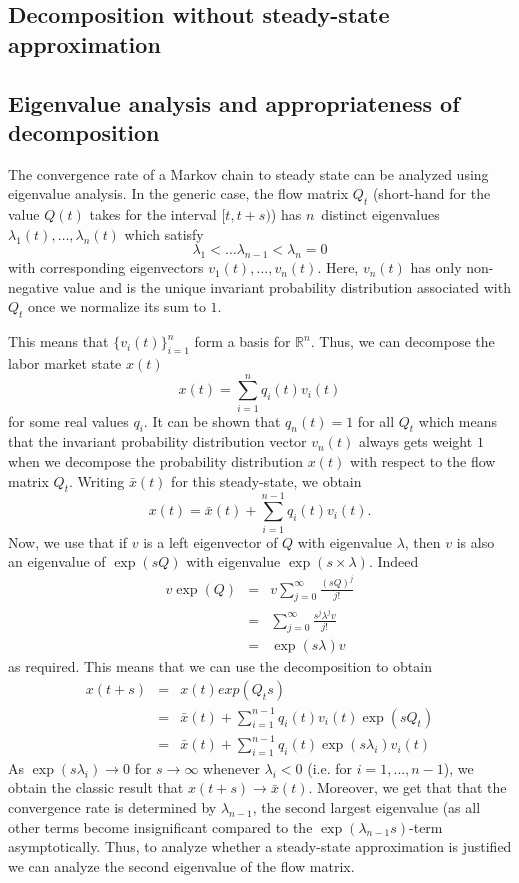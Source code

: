 \subsection{Decomposition without steady-state approximation}
\subsection{Eigenvalue analysis and appropriateness of decomposition}
The convergence rate of a Markov chain to steady state can be analyzed using eigenvalue analysis. In the generic case, the flow matrix $Q_t$ (short-hand for the value $Q(t)$ takes for the interval $[t,t+s)$) has $n$ distinct eigenvalues $\lambda_1(t),\dots,\lambda_n(t)$ which satisfy
\[
\lambda_1 < \dots \lambda_{n-1}<\lambda_n = 0
\]
with corresponding eigenvectors $v_1(t),\dots,v_n(t)$. Here, $v_n(t)$ has only non-negative value and is the unique invariant probability distribution associated with $Q_t$ once we normalize its sum to $1$.

This means that $\{v_i(t)\}_{i=1}^n$ form a basis for $\mathbb{R}^n$. Thus, we can decompose the labor market state $x(t)$
\[
x(t)=\sum_{i=1}^n q_i(t)v_i(t)
\]
for some real values $q_i$. It can be shown that $q_n(t)=1$ for all $Q_t$ which means that the invariant probability distribution vector $v_n(t)$ always gets weight $1$ when we decompose the probability distribution $x(t)$ with respect to the flow matrix $Q_t$. Writing $\bar{x}(t)$ for this steady-state, we obtain
\[
x(t)=\bar{x}(t)+\sum_{i=1}^{n-1}q_i(t)v_i(t).
\]
Now, we use that if $v$ is a left eigenvector of $Q$ with eigenvalue $\lambda$, then $v$ is also an eigenvalue of $\exp(sQ)$ with eigenvalue $\exp(s\times\lambda)$. Indeed
\begin{eqnarray*}
v\exp(Q)&=&v\sum_{j=0}^\infty \frac{(sQ)^j}{j!}\\
&=&\sum_{j=0}^\infty \frac{s^j \lambda^j v}{j!}\\
&=&\exp(s\lambda)v
\end{eqnarray*}
as required. This means that we can use the decomposition to obtain
\begin{eqnarray*}
x(t+s)&=&x(t)exp(Q_t s)\\
&=&\bar{x}(t)+\sum_{i=1}^{n-1}q_i(t)v_i(t)\exp(sQ_t)\\
&=&\bar{x}(t)+\sum_{i=1}^{n-1}q_i(t)\exp(s\lambda_i)v_i(t)
\end{eqnarray*}
As $\exp(s\lambda_i)\to 0$ for $s\to\infty$ whenever $\lambda_i<0$ (i.e. for $i=1,\dots,n-1$), we obtain the classic result that $x(t+s)\to \bar{x}(t)$. Moreover, we get that that the convergence rate is determined by $\lambda_{n-1}$, the second largest eigenvalue (as all other terms become insignificant compared to the $\exp(\lambda_{n-1}s)$-term asymptotically. Thus, to analyze whether a steady-state approximation is justified we can analyze the second eigenvalue of the flow matrix.

